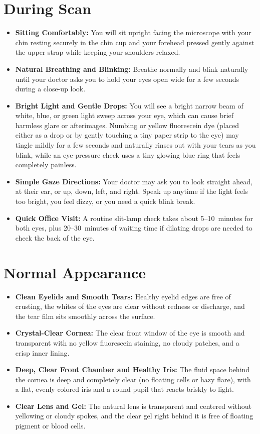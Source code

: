 \section{During Scan}

\begin{itemize}
    \item \textbf{Sitting Comfortably:} You will sit upright facing the microscope with your chin resting securely in the chin cup and your forehead pressed gently against the upper strap while keeping your shoulders relaxed.
    \item \textbf{Natural Breathing and Blinking:} Breathe normally and blink naturally until your doctor asks you to hold your eyes open wide for a few seconds during a close-up look.
    \item \textbf{Bright Light and Gentle Drops:} You will see a bright narrow beam of white, blue, or green light sweep across your eye, which can cause brief harmless glare or afterimages. Numbing or yellow fluorescein dye (placed either as a drop or by gently touching a tiny paper strip to the eye) may tingle mildly for a few seconds and naturally rinses out with your tears as you blink, while an eye-pressure check uses a tiny glowing blue ring that feels completely painless.
    \item \textbf{Simple Gaze Directions:} Your doctor may ask you to look straight ahead, at their ear, or up, down, left, and right. Speak up anytime if the light feels too bright, you feel dizzy, or you need a quick blink break.
    \item \textbf{Quick Office Visit:} A routine slit-lamp check takes about 5--10~minutes for both eyes, plus 20--30~minutes of waiting time if dilating drops are needed to check the back of the eye.
\end{itemize}

\section{Normal Appearance}

\begin{itemize}
    \item \textbf{Clean Eyelids and Smooth Tears:} Healthy eyelid edges are free of crusting, the whites of the eyes are clear without redness or discharge, and the tear film sits smoothly across the surface.
    \item \textbf{Crystal-Clear Cornea:} The clear front window of the eye is smooth and transparent with no yellow fluorescein staining, no cloudy patches, and a crisp inner lining.
    \item \textbf{Deep, Clear Front Chamber and Healthy Iris:} The fluid space behind the cornea is deep and completely clear (no floating cells or hazy flare), with a flat, evenly colored iris and a round pupil that reacts briskly to light.
    \item \textbf{Clear Lens and Gel:} The natural lens is transparent and centered without yellowing or cloudy spokes, and the clear gel right behind it is free of floating pigment or blood cells.
\end{itemize}

